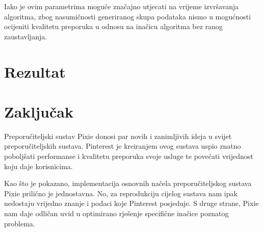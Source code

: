 \documentclass[times, utf8, seminar]{fer}
\begin{document}
Iako je ovim parametrima moguće značajno utjecati na vrijeme izvršavanja algoritma, zbog nasumičnosti generiranog skupa podataka nismo u mogućnosti ocijeniti kvalitetu preporuka u odnosu na inačicu algoritma bez ranog zaustavljanja.

\chapter{Rezultat}

\chapter{Zaključak}

Preporučiteljski sustav Pixie donosi par novih i zanimljivih ideja u svijet preporučiteljskih sustava. Pinterest je kreiranjem ovog sustava uspio znatno poboljšati performanse i kvalitetu preporuka svoje usluge te povećati vrijednost koju daje korisnicima.

Kao što je pokazano, implementacija osnovnih načela preporučiteljskog sustava Pixie prilično je jednostavna. No, za reprodukciju cijelog sustava nam ipak nedostaju vrijedno znanje i podaci koje Pinterest posjeduje. S druge strane, Pixie nam daje odličan uvid u optimirano rješenje specifične inačice poznatog problema.



\end{document}
